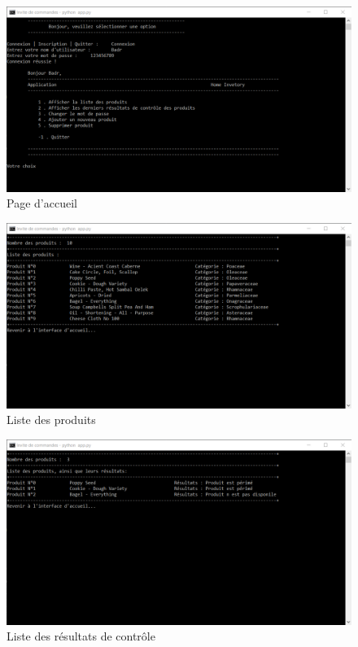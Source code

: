 \begin{figure}[ht!]
    \centering
    \includegraphics[keepaspectratio=true,scale=0.7]{Figures/img2.png}
    \caption{Page d'accueil}
    \label{fig:img1}
\end{figure}

\begin{figure}[ht!]
    \centering
    \includegraphics[keepaspectratio=true,scale=0.7]{Figures/img3.png}
    \caption{Liste des produits}
    \label{fig:img1}
\end{figure}

\begin{figure}[ht!]
    \centering
    \includegraphics[keepaspectratio=true,scale=0.7]{Figures/img4.png}
    \caption{Liste des résultats de contrôle}
    \label{fig:img1}
\end{figure}
